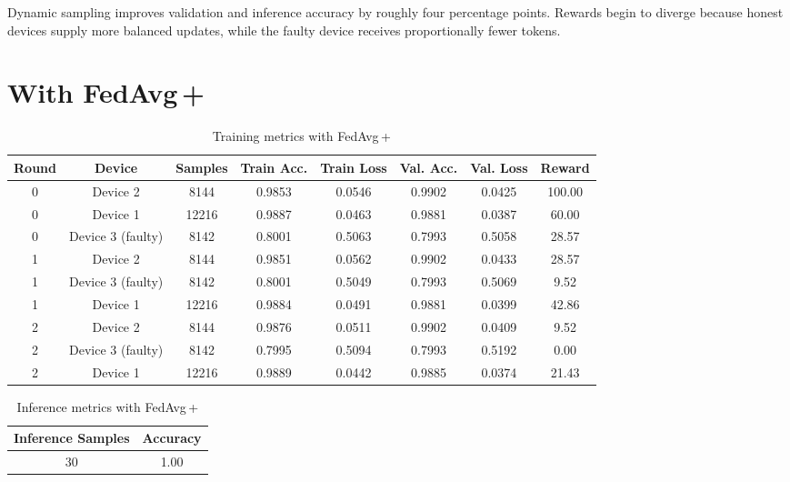 Dynamic sampling improves validation and inference accuracy by roughly four percentage points. Rewards begin to diverge because honest devices supply more balanced updates, while the faulty device receives proportionally fewer tokens.

\section{With FedAvg\,+ }

\begin{table}[h!]
    \centering
    \caption{Training metrics with FedAvg\,+}
    \label{tab:fedavg_plus}
    \begin{tabular}{c c c c c c c c}
        \toprule
        \textbf{Round} & \textbf{Device} & \textbf{Samples} & \textbf{Train Acc.} & \textbf{Train Loss} & \textbf{Val. Acc.} & \textbf{Val. Loss} & \textbf{Reward} \\
        \midrule
        0 & Device 2 & 8144 & 0.9853 & 0.0546 & 0.9902 & 0.0425 & 100.00 \\
        0 & Device 1 & 12216 & 0.9887 & 0.0463 & 0.9881 & 0.0387 & 60.00 \\
        0 & Device 3 (faulty) & 8142 & 0.8001 & 0.5063 & 0.7993 & 0.5058 & 28.57 \\
        1 & Device 2 & 8144 & 0.9851 & 0.0562 & 0.9902 & 0.0433 & 28.57 \\
        1 & Device 3 (faulty) & 8142 & 0.8001 & 0.5049 & 0.7993 & 0.5069 & 9.52 \\
        1 & Device 1 & 12216 & 0.9884 & 0.0491 & 0.9881 & 0.0399 & 42.86 \\
        2 & Device 2 & 8144 & 0.9876 & 0.0511 & 0.9902 & 0.0409 & 9.52 \\
        2 & Device 3 (faulty) & 8142 & 0.7995 & 0.5094 & 0.7993 & 0.5192 & 0.00 \\
        2 & Device 1 & 12216 & 0.9889 & 0.0442 & 0.9885 & 0.0374 & 21.43 \\
        \bottomrule
    \end{tabular}
\end{table}

\begin{table}[h!]
    \centering
    \caption{Inference metrics with FedAvg\,+}
    \label{tab:fedavg_plus_inference}
    \begin{tabular}{c c}
        \toprule
        \textbf{Inference Samples} & \textbf{Accuracy} \\
        \midrule
        30 & 1.00 \\
        \bottomrule
    \end{tabular}
\end{table}

